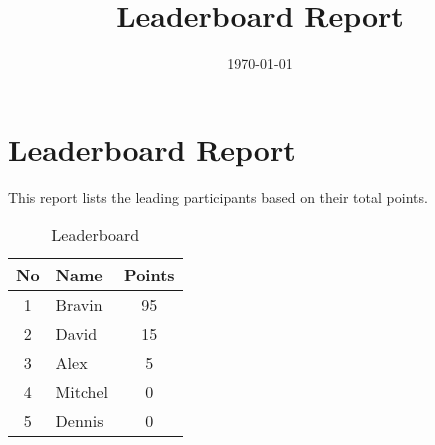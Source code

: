 \documentclass[a4paper,12pt]{article}
\title{Leaderboard Report}
\author{}
\date{\today}
\begin{document}
\maketitle

\section*{Leaderboard Report}
This report lists the leading participants based on their total points.

\begin{landscape}
\begin{table}[h]
\centering
\caption{Leaderboard}
\begin{tabular}{|c|l|c|}
\toprule
\textbf{No} & \textbf{Name} & \textbf{Points} \\
\midrule
\hline
1 & Bravin & 95 \\
\hline
2 & David & 15 \\
\hline
3 & Alex & 5 \\
\hline
4 & Mitchel & 0 \\
\hline
5 & Dennis & 0 \\

\bottomrule
\end{tabular}
\end{table}
\end{landscape}
\end{document}
